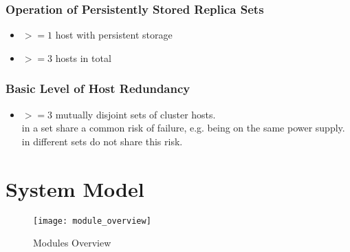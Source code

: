 \documentclass[a4paper, 11pt]{article}
\begin{document}
\subsubsection{Operation of Persistently Stored Replica Sets}
\begin{itemize}
	\item $>= 1$ \gls{host} with \gls{persistent storage}
	\item $>= 3$ \glspl{host} in total
\end{itemize}

\subsubsection{Basic Level of Host Redundancy}
\begin{itemize}
	\item $>= 3$ mutually disjoint sets of \gls{cluster} \glspl{host}. \\  in a set share a common risk of failure, e.g. being on the same power supply.  in different sets do not share this risk.
\end{itemize}

\section{System Model}
\begin{figure}[H]
\texttt{[image: module\_overview]}
\caption{\mamid Modules Overview}
\end{figure}
\end{document}
